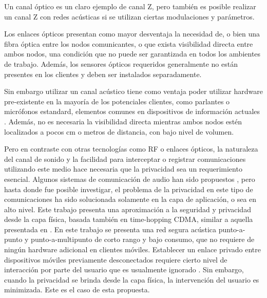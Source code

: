 Un canal óptico es un claro ejemplo de canal Z, pero también es posible realizar un canal Z con redes acústicas si se utilizan ciertas modulaciones y parámetros.

Los enlaces ópticos presentan como mayor desventaja la necesidad de, o bien una fibra óptica entre los nodos comunicantes, o que exista visibilidad directa entre ambos nodos, una condición que no puede ser garantizada en todos los ambientes de trabajo. Además, los sensores ópticos requeridos generalmente no están presentes en los clientes y deben ser instalados separadamente.

Sin embargo utilizar un canal acústico tiene como ventaja poder utilizar hardware pre-existente en la mayoría de los potenciales clientes, como parlantes o micrófonos estandard, elementos comunes en dispositivos de información actuales \cite{citeulike:12800468}. Además, no es necesaria la visibilidad directa mientras ambos nodos estén localizados a pocos cm o metros de distancia, con bajo nivel de volumen.

Pero en contraste con otras tecnologías como RF o enlaces ópticos, la naturaleza del canal de sonido y la facilidad para interceptar o registrar comunicaciones utilizando este medio hace necesaria que la privacidad sea un requerimiento esencial. Algunos sistemas de comunicación de audio han sido propuestos \cite{august2002apparatus}, pero hasta donde fue posible investigar, el problema de la privacidad en este tipo de comunicaciones ha sido solucionada solamente en la capa de aplicación, o sea en alto nivel. Este trabajo presenta una aproximación a la seguridad y privacidad desde la capa física, basada también en time-hopping CDMA, similar a aquella presentada en \cite{6476559}. En este trabajo se presenta una red segura acústica punto-a-punto y punto-a-multipunto de corto rango y bajo consumo, que no requiere de ningún hardware adicional en clientes móviles.
Establecer un enlace privado entre dispositivos móviles previamente desconectados requiere cierto nivel de interacción por parte del usuario que es usualmente ignorado \cite{4912753}. Sin embargo, cuando la privacidad se brinda desde la capa física, la intervención del usuario es minimizada. Este es el caso de esta propuesta.

